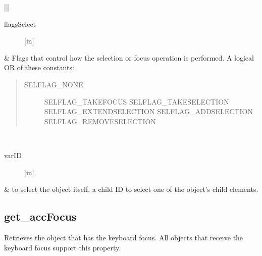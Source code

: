 \documentclass[letterpaper,12pt,english,openany,oneside]{sphinxmanual}
\begin{document}
\begin{sphinxVerbatim}[commandchars=\\\{\}]
    
\end{sphinxVerbatim}



\begin{savenotes}\sphinxattablestart
\centering
{}\label{\detokenize{MSAA_PDF:section-12}}\nobreak
\begin{tabular}[t]{|*{2}{|}}
\hline
\begin{description}
\item[{flagsSelect}] \leavevmode
{[}in{]}

\end{description}
&
Flags that control how the selection or focus operation is performed. A logical OR of these  constants:
\begin{quote}
\begin{description}
\item[{SELFLAG\_NONE}] \leavevmode
SELFLAG\_TAKEFOCUS
SELFLAG\_TAKESELECTION
SELFLAG\_EXTENDSELECTION
SELFLAG\_ADDSELECTION
SELFLAG\_REMOVESELECTION

\end{description}
\end{quote}
\\
\hline\begin{description}
\item[{varID}] \leavevmode
{[}in{]}

\end{description}
&
 to select the object itself, a child ID to select one of the object’s child elements.
\\
\hline
\end{tabular}
\par
\sphinxattableend\end{savenotes}


\begin{sphinxVerbatim}[commandchars=\\\{\}]
\end{sphinxVerbatim}


\subsection{get\_accFocus}
\label{\detokenize{MSAA_PDF:get-accfocus}}
Retrieves the object that has the keyboard focus. All objects that receive the keyboard focus support this property.
\end{document}
